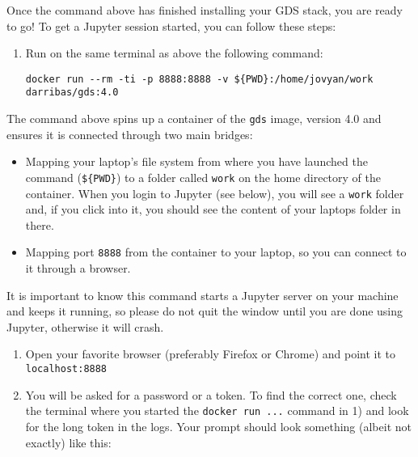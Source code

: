 \documentclass[]{book}
\providecommand{\tightlist}{%
  \setlength{\itemsep}{0pt}\setlength{\parskip}{0pt}}
\begin{document}
Once the command above has finished installing your GDS stack, you are
ready to go! To get a Jupyter session started, you can follow these
steps:

\begin{enumerate}
\def\labelenumi{\arabic{enumi}.}
\item
  Run on the same terminal as above the following command:

\begin{verbatim}
docker run --rm -ti -p 8888:8888 -v ${PWD}:/home/jovyan/work darribas/gds:4.0
\end{verbatim}
\end{enumerate}

The command above spins up a container of the \texttt{gds} image,
version 4.0 and ensures it is connected through two main bridges:

\begin{itemize}
\tightlist
\item
  Mapping your laptop's file system from where you have launched the
  command (\texttt{\$\{PWD\}}) to a folder called \texttt{work} on the
  home directory of the container. When you login to Jupyter (see
  below), you will see a \texttt{work} folder and, if you click into it,
  you should see the content of your laptops folder in there.
\item
  Mapping port \texttt{8888} from the container to your laptop, so you
  can connect to it through a browser.
\end{itemize}

It is important to know this command starts a Jupyter server on your
machine and keeps it running, so please do not quit the window until you
are done using Jupyter, otherwise it will crash.

\begin{enumerate}
\def\labelenumi{\arabic{enumi}.}
\setcounter{enumi}{1}
\tightlist
\item
  Open your favorite browser (preferably Firefox or Chrome) and point it
  to \texttt{localhost:8888}
\item
  You will be asked for a password or a token. To find the correct one,
  check the terminal where you started the \texttt{docker\ run\ ...}
  command in 1) and look for the long token in the logs. Your prompt
  should look something (albeit not exactly) like this:
\end{enumerate}
\end{document}
